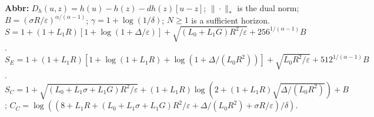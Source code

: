 \begin{table}[tp]
\begin{threeparttable}
\begin{tablenotes}[flushleft]\footnotesize
\item[] \textbf{Abbr:} $D_h(u,z)=h(u)-h(z)-dh(z)[u-z]$; $\|\cdot\|_*$ is the dual norm; $B=(\sigma R/\varepsilon)^{\alpha/(\alpha-1)}$; $\gamma=1+\log(1/\delta)$; $N\ge1$ is a sufficient horizon. $S=1+(1+L_1R)[1+\log(1+\Delta/\varepsilon)]+\sqrt{(L_0+L_1G)R^2/\varepsilon}+256^{1/(\alpha-1)}B$. $S_E=1+(1+L_1R)[1+\log(1+L_1R)+\log(1+\Delta/(L_0R^2))]+\sqrt{L_0R^2/\varepsilon}+512^{1/(\alpha-1)}B$. $S_C=1+\sqrt{(L_0+L_1\sigma+L_1G)R^2/\varepsilon}+(1+L_1R)\log(2+(1+L_1R)\sqrt{\Delta/(L_0R^2)})+B$; $C_C=\log((8+L_1R+(L_0+L_1\sigma+L_1G)R^2/\varepsilon+\Delta/(L_0R^2)+\sigma R/\varepsilon)/\delta)$.
\end{tablenotes}
\end{threeparttable}
\end{table}
\clearpage
